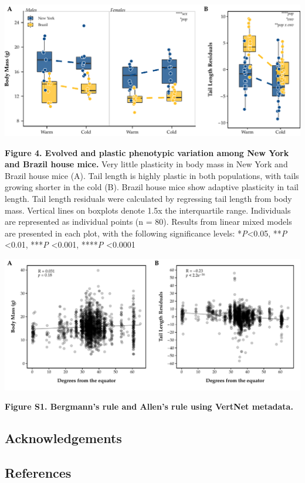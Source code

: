 \documentclass[]{article}
\begin{document}
\newpage

\includegraphics{../figures/RXNs.pdf}

\textbf{Figure 4. Evolved and plastic phenotypic variation among New
York and Brazil house mice.} Very little plasticity in body mass in New
York and Brazil house mice (A). Tail length is highly plastic in both
populations, with tails growing shorter in the cold (B). Brazil house
mice show adaptive plasticity in tail length. Tail length residuals were
calculated by regressing tail length from body mass. Vertical lines on
boxplots denote 1.5x the interquartile range. Individuals are
represented as individual points (n = 80). Results from linear mixed
models are presented in each plot, with the following significance
levels: *\emph{P}\textless{}0.05, **\emph{P} \textless{}0.01,
***\emph{P} \textless{}0.001, ****\emph{P} \textless{}0.0001

\newpage

\includegraphics{../figures/VertNet_metadata.pdf}

\textbf{Figure S1. Bergmann's rule and Allen's rule using VertNet
metadata.}

\newpage

\hypertarget{acknowledgements}{%
\subsection{Acknowledgements}\label{acknowledgements}}

\newpage

\hypertarget{references}{%
\subsection{References}\label{references}}
\end{document}
